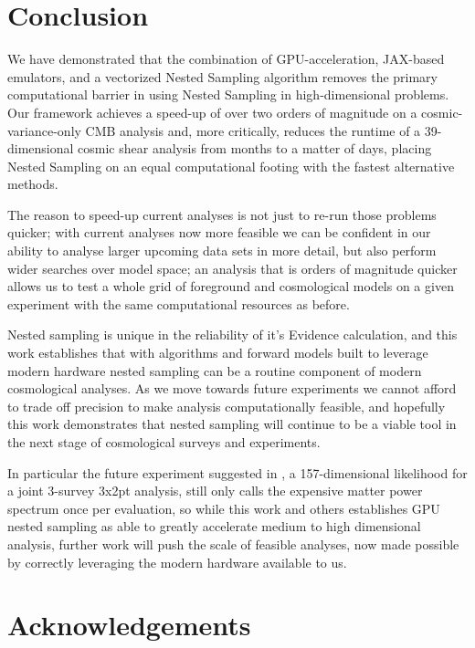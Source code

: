 \documentclass[twocolumn]{openjournal}
\begin{document}
\section{Conclusion}

We have demonstrated that the combination of GPU-acceleration, JAX-based emulators, and a vectorized Nested Sampling algorithm removes the primary computational barrier in using Nested Sampling in high-dimensional problems. Our framework achieves a speed-up of over two orders of magnitude on a cosmic-variance-only CMB analysis and, more critically, reduces the runtime of a 39-dimensional cosmic shear analysis from months to a matter of days, placing Nested Sampling on an equal computational footing with the fastest alternative methods.

The reason to speed-up current analyses is not just to re-run those problems quicker; with current analyses now more feasible we can be confident in our ability to analyse larger upcoming data sets in more detail, but also perform wider searches over model space; an analysis that is orders of magnitude quicker allows us to test a whole grid of foreground and cosmological models on a given experiment with the same computational resources as before.

Nested sampling is unique in the reliability of it's Evidence calculation, and this work establishes that with algorithms and forward models built to leverage modern hardware nested sampling can be a routine component of modern cosmological analyses. As we move towards future experiments we cannot afford to trade off precision to make analysis computationally feasible, and hopefully this work demonstrates that nested sampling will continue to be a viable tool in the next stage of cosmological surveys and experiments.

In particular the future experiment suggested in \cite{Piras_2023}, a 157-dimensional likelihood for a joint 3-survey 3x2pt analysis, still only calls the expensive matter power spectrum once per evaluation, so while this work and others \citep{NSSyallup,metha} establishes GPU nested sampling as able to greatly accelerate medium to high dimensional analysis, further work will push the scale of feasible analyses, now made possible by correctly leveraging the modern hardware available to us.

\section*{Acknowledgements}
\end{document}
